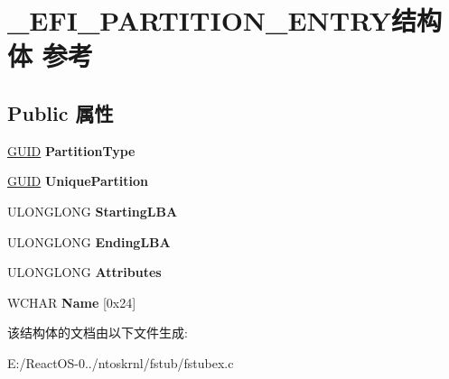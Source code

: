 \hypertarget{struct___e_f_i___p_a_r_t_i_t_i_o_n___e_n_t_r_y}{}\section{\+\_\+\+E\+F\+I\+\_\+\+P\+A\+R\+T\+I\+T\+I\+O\+N\+\_\+\+E\+N\+T\+R\+Y结构体 参考}
\label{struct___e_f_i___p_a_r_t_i_t_i_o_n___e_n_t_r_y}
\subsection*{Public 属性}
\begin{DoxyCompactItemize}
\item 
\mbox{\label{struct___e_f_i___p_a_r_t_i_t_i_o_n___e_n_t_r_y_a40b1a32d9903edf0c716029923c82b0c}} 
\hyperlink{interface_g_u_i_d}{G\+U\+ID} {\bfseries Partition\+Type}
\item 
\mbox{\label{struct___e_f_i___p_a_r_t_i_t_i_o_n___e_n_t_r_y_a1fbf04fb45fb67508ee2d204a595d3e8}} 
\hyperlink{interface_g_u_i_d}{G\+U\+ID} {\bfseries Unique\+Partition}
\item 
\mbox{\label{struct___e_f_i___p_a_r_t_i_t_i_o_n___e_n_t_r_y_a4d50aa9d2cbf395f4645044860406d59}} 
U\+L\+O\+N\+G\+L\+O\+NG {\bfseries Starting\+L\+BA}
\item 
\mbox{\label{struct___e_f_i___p_a_r_t_i_t_i_o_n___e_n_t_r_y_aebaf2455a2a7902589d86700ad11d33d}} 
U\+L\+O\+N\+G\+L\+O\+NG {\bfseries Ending\+L\+BA}
\item 
\mbox{\label{struct___e_f_i___p_a_r_t_i_t_i_o_n___e_n_t_r_y_a9c9de1257a93226eb704b64d01135e9e}} 
U\+L\+O\+N\+G\+L\+O\+NG {\bfseries Attributes}
\item 
\mbox{\label{struct___e_f_i___p_a_r_t_i_t_i_o_n___e_n_t_r_y_a5257784ce78b3b702fc5b2415bc00181}} 
W\+C\+H\+AR {\bfseries Name} \mbox{[}0x24\mbox{]}
\end{DoxyCompactItemize}


该结构体的文档由以下文件生成\+:\begin{DoxyCompactItemize}
\item 
E\+:/\+React\+O\+S-\/0../ntoskrnl/fstub/fstubex.\+c\end{DoxyCompactItemize}
